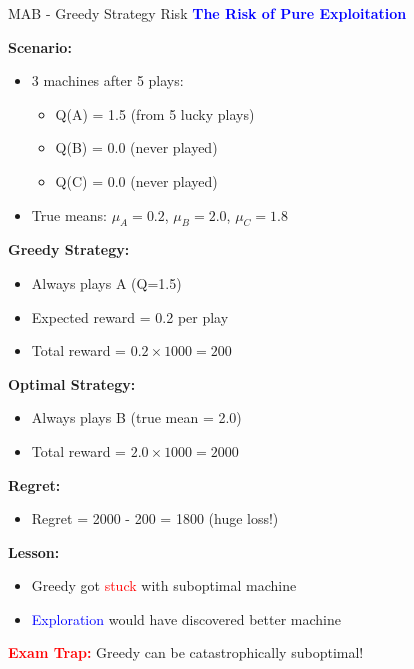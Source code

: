 \documentclass[8pt]{beamer}
\begin{document}
	\begin{frame}{MAB - Greedy Strategy Risk}
		\fontsize{6.5}{7.5}\selectfont
		\textcolor{blue}{\textbf{The Risk of Pure Exploitation}}
		
		\textbf{Scenario:}
		\begin{itemize}
			\item 3 machines after 5 plays:
			\begin{itemize}
				\item Q(A) = 1.5 (from 5 lucky plays)
				\item Q(B) = 0.0 (never played)
				\item Q(C) = 0.0 (never played)
			\end{itemize}
			\item True means: $\mu_A = 0.2$, $\mu_B = 2.0$, $\mu_C = 1.8$
		\end{itemize}
		
		\textbf{Greedy Strategy:}
		\begin{itemize}
			\item Always plays A (Q=1.5)
			\item Expected reward = 0.2 per play
			\item Total reward = $0.2 \times 1000 = 200$
		\end{itemize}
		
		\textbf{Optimal Strategy:}
		\begin{itemize}
			\item Always plays B (true mean = 2.0)
			\item Total reward = $2.0 \times 1000 = 2000$
		\end{itemize}
		
		\textbf{Regret:}
		\begin{itemize}
			\item Regret = 2000 - 200 = 1800 (huge loss!)
		\end{itemize}
		
		\textbf{Lesson:}
		\begin{itemize}
			\item Greedy got \textcolor{red}{stuck} with suboptimal machine
			\item \textcolor{blue}{Exploration} would have discovered better machine
		\end{itemize}
		
		\textcolor{red}{\textbf{Exam Trap:}} Greedy can be catastrophically suboptimal!
	\end{frame}
	
\end{document}
